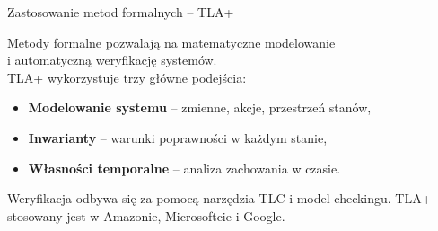 \documentclass{purdue-poster}
\begin{document}
\begin{frame}{}
\begin{columns}[c]
\begin{column}{.48\linewidth}
\begin{block}{Zastosowanie metod formalnych – TLA+}
\begin{minipage}[c]{0.35\textwidth}
            \vspace{0.5cm}
        \end{minipage}
        \hfill
        \begin{minipage}[c]{0.6\textwidth}
        Metody formalne pozwalają na matematyczne modelowanie\\ i automatyczną weryfikację systemów.\\  
        TLA+ wykorzystuje trzy główne podejścia:
        \begin{itemize}
            \item \textbf{Modelowanie systemu} – zmienne, akcje, przestrzeń stanów,
            \item \textbf{Inwarianty} – warunki poprawności w każdym stanie,
            \item \textbf{Własności temporalne} – analiza zachowania w czasie.
        \end{itemize}
        Weryfikacja odbywa się za pomocą narzędzia TLC i model checkingu. TLA+ stosowany jest w Amazonie, Microsoftcie i Google.
        \end{minipage}
    \end{block}

    \end{column}

    \begin{column}{.48\linewidth}
    

\end{column}
\end{columns}
\end{frame}
\end{document}
